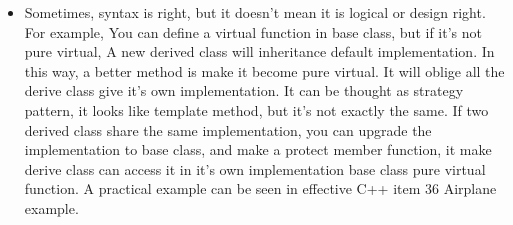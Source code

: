 \documentclass[a4paper,12pt,twoside]{book}
\begin{document}
\begin{itemize}
	\item Sometimes,  syntax is right, but it doesn't mean it is logical  or design right. For example,  You can define a  virtual function in base class, but if it's not pure virtual, A new derived class will inheritance default implementation.  In this way, a better method is make it become pure virtual.  It will oblige all the derive class give it's own  implementation. It can be thought as strategy pattern, it looks like template method, but it's not exactly the same.  If two derived class share the same  implementation, you can upgrade the implementation to base class, and make a protect member function, it make derive class can access it in it's own implementation base class pure virtual function. A practical example can be seen in effective C++ item 36 Airplane example.
	
	
\end{itemize}
\end{document}
